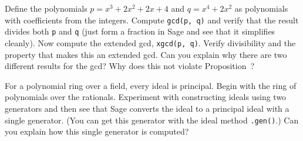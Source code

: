 %
%
Define the polynomials $p = x^3 + 2x^2 + 2x + 4$ and $q = x^4 + 2x^2$ as polynomials with coefficients from the integers.  Compute \verb?gcd(p, q)? and verify that the result divides both \verb?p? and \verb?q? (just form a fraction in Sage and see that it simplifies cleanly).  Now compute the extended gcd, \verb?xgcd(p, q)?.  Verify divisibility and the property that makes this an extended gcd.  Can you explain why there are two different results for the gcd?  Why does this not violate Proposition~?
\begin{sageverbatim}\end{sageverbatim}
%
%
For a polynomial ring over a field, every ideal is principal.  Begin with the ring of polynomials over the rationals.  Experiment with constructing ideals using two generators and then see that Sage converts the ideal to a principal ideal with a single generator.  (You can get this generator with the ideal method \verb?.gen()?.)  Can you explain how this single generator is computed?
\begin{sageverbatim}\end{sageverbatim}
